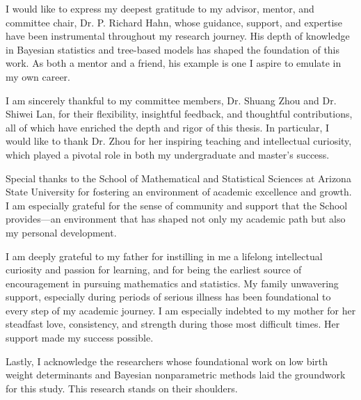 
I would like to express my deepest gratitude to my advisor, mentor, and committee chair, Dr. P. Richard Hahn, whose guidance, support, and expertise have been instrumental throughout my research journey. His depth of knowledge in Bayesian statistics and tree-based models has shaped the foundation of this work. As both a mentor and a friend, his example is one I aspire to emulate in my own career.

I am sincerely thankful to my committee members, Dr. Shuang Zhou and Dr. Shiwei Lan, for their flexibility, insightful feedback, and thoughtful contributions, all of which have enriched the depth and rigor of this thesis. In particular, I would like to thank Dr. Zhou for her inspiring teaching and intellectual curiosity, which played a pivotal role in both my undergraduate and master's success. 

Special thanks to the School of Mathematical and Statistical Sciences at Arizona State University for fostering an environment of academic excellence and growth. I am especially grateful for the sense of community and support that the School provides—an environment that has shaped not only my academic path but also my personal development.

I am deeply grateful to my father for instilling in me a lifelong intellectual curiosity and passion for learning, and for being the earliest source of encouragement in pursuing mathematics and statistics. My family unwavering support, especially during periods of serious illness has been foundational to every step of my academic journey. I am especially indebted to my mother for her steadfast love, consistency, and strength during those most difficult times. Her support made my success possible. 

Lastly, I acknowledge the researchers whose foundational work on low birth weight determinants and Bayesian nonparametric methods laid the groundwork for this study. This research stands on their shoulders.